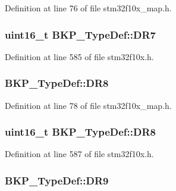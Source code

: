Definition at line 76 of file stm32f10x\+\_\+map.\+h.

\subsubsection[{\texorpdfstring{D\+R7}{DR7}}]{ {\bf uint16\+\_\+t} B\+K\+P\+\_\+\+Type\+Def\+::\+D\+R7}\hypertarget{struct_b_k_p___type_def_a2467a2e314a670b8638ad75f6d9122bf}{}\label{struct_b_k_p___type_def_a2467a2e314a670b8638ad75f6d9122bf}


Definition at line 585 of file stm32f10x.\+h.

\subsubsection[{\texorpdfstring{D\+R8}{DR8}}]{ B\+K\+P\+\_\+\+Type\+Def\+::\+D\+R8}\hypertarget{struct_b_k_p___type_def_a265cd2a9e7af3cdd9e5188a34acd9b45}{}\label{struct_b_k_p___type_def_a265cd2a9e7af3cdd9e5188a34acd9b45}


Definition at line 78 of file stm32f10x\+\_\+map.\+h.

\subsubsection[{\texorpdfstring{D\+R8}{DR8}}]{ {\bf uint16\+\_\+t} B\+K\+P\+\_\+\+Type\+Def\+::\+D\+R8}\hypertarget{struct_b_k_p___type_def_a70ccbdbdaf902903f378f110685ee647}{}\label{struct_b_k_p___type_def_a70ccbdbdaf902903f378f110685ee647}


Definition at line 587 of file stm32f10x.\+h.

\subsubsection[{\texorpdfstring{D\+R9}{DR9}}]{ B\+K\+P\+\_\+\+Type\+Def\+::\+D\+R9}\hypertarget{struct_b_k_p___type_def_ab28fb84cdca9c0a1e717ffc9b3d817a5}{}\label{struct_b_k_p___type_def_ab28fb84cdca9c0a1e717ffc9b3d817a5}


